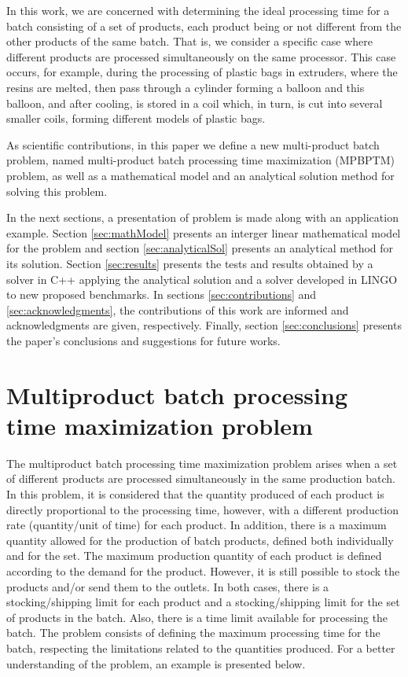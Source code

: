 \documentclass[preprint,12pt,authoryear]{elsarticle}
\begin{document}
In this work, we are concerned with determining the ideal processing time for a batch consisting of a set of products, each product being or not different from the other products of the same batch. That is, we consider a specific case where different products are processed simultaneously on the same processor. This case occurs, for example, during the processing of plastic bags in extruders, where the resins are melted, then pass through a cylinder forming a balloon and this balloon, and after cooling, is stored in a coil which, in turn, is cut into several smaller coils, forming different models of plastic bags. 

As scientific contributions, in this paper we define a new multi-product batch problem, named multi-product batch processing time maximization (MPBPTM) problem, as well as a mathematical model and an analytical solution method for solving this problem.

In the next sections, a presentation of problem is made along with an application example. Section \ref{sec:mathModel} presents an interger linear mathematical model for the problem and section \ref{sec:analyticalSol} presents an analytical method for its solution. Section \ref{sec:results} presents the tests and results obtained by a solver in C++ applying the analytical solution and a solver developed in LINGO to new proposed benchmarks. In sections \ref{sec:contributions} and \ref{sec:acknowledgments}, the contributions of this work are informed and acknowledgments are given, respectively. Finally, section \ref{sec:conclusions} presents the paper's conclusions and suggestions for future works.

\section{Multiproduct batch processing time maximization problem}
\label{sec:MBPTMP}

The multiproduct batch processing time maximization problem arises when a set of different products are processed simultaneously in the same production batch. In this problem, it is considered that the quantity produced of each product is directly proportional to the processing time, however, with a different production rate (quantity/unit of time) for each product. In addition, there is a maximum quantity allowed for the production of batch products, defined both individually and for the set. The maximum production quantity of each product is defined according to the demand for the product. However, it is still possible to stock the products and/or send them to the outlets. In both cases, there is a stocking/shipping limit for each product and a stocking/shipping limit for the set of products in the batch. Also, there is a time limit available for processing the batch. The problem consists of defining the maximum processing time for the batch, respecting the limitations related to the quantities produced. For a better understanding of the problem, an example is presented below.
\end{document}
